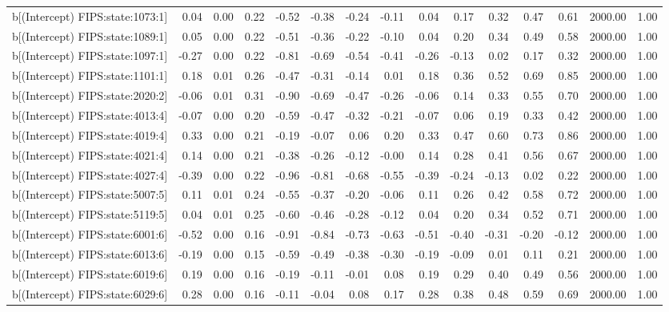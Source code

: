 \begin{table}[ht]
\begin{tabular}{rrrrrrrrrrrrrrr}
  b[(Intercept) FIPS:state:1073:1] & 0.04 & 0.00 & 0.22 & -0.52 & -0.38 & -0.24 & -0.11 & 0.04 & 0.17 & 0.32 & 0.47 & 0.61 & 2000.00 & 1.00 \\ 
  b[(Intercept) FIPS:state:1089:1] & 0.05 & 0.00 & 0.22 & -0.51 & -0.36 & -0.22 & -0.10 & 0.04 & 0.20 & 0.34 & 0.49 & 0.58 & 2000.00 & 1.00 \\ 
  b[(Intercept) FIPS:state:1097:1] & -0.27 & 0.00 & 0.22 & -0.81 & -0.69 & -0.54 & -0.41 & -0.26 & -0.13 & 0.02 & 0.17 & 0.32 & 2000.00 & 1.00 \\ 
  b[(Intercept) FIPS:state:1101:1] & 0.18 & 0.01 & 0.26 & -0.47 & -0.31 & -0.14 & 0.01 & 0.18 & 0.36 & 0.52 & 0.69 & 0.85 & 2000.00 & 1.00 \\ 
  b[(Intercept) FIPS:state:2020:2] & -0.06 & 0.01 & 0.31 & -0.90 & -0.69 & -0.47 & -0.26 & -0.06 & 0.14 & 0.33 & 0.55 & 0.70 & 2000.00 & 1.00 \\ 
  b[(Intercept) FIPS:state:4013:4] & -0.07 & 0.00 & 0.20 & -0.59 & -0.47 & -0.32 & -0.21 & -0.07 & 0.06 & 0.19 & 0.33 & 0.42 & 2000.00 & 1.00 \\ 
  b[(Intercept) FIPS:state:4019:4] & 0.33 & 0.00 & 0.21 & -0.19 & -0.07 & 0.06 & 0.20 & 0.33 & 0.47 & 0.60 & 0.73 & 0.86 & 2000.00 & 1.00 \\ 
  b[(Intercept) FIPS:state:4021:4] & 0.14 & 0.00 & 0.21 & -0.38 & -0.26 & -0.12 & -0.00 & 0.14 & 0.28 & 0.41 & 0.56 & 0.67 & 2000.00 & 1.00 \\ 
  b[(Intercept) FIPS:state:4027:4] & -0.39 & 0.00 & 0.22 & -0.96 & -0.81 & -0.68 & -0.55 & -0.39 & -0.24 & -0.13 & 0.02 & 0.22 & 2000.00 & 1.00 \\ 
  b[(Intercept) FIPS:state:5007:5] & 0.11 & 0.01 & 0.24 & -0.55 & -0.37 & -0.20 & -0.06 & 0.11 & 0.26 & 0.42 & 0.58 & 0.72 & 2000.00 & 1.00 \\ 
  b[(Intercept) FIPS:state:5119:5] & 0.04 & 0.01 & 0.25 & -0.60 & -0.46 & -0.28 & -0.12 & 0.04 & 0.20 & 0.34 & 0.52 & 0.71 & 2000.00 & 1.00 \\ 
  b[(Intercept) FIPS:state:6001:6] & -0.52 & 0.00 & 0.16 & -0.91 & -0.84 & -0.73 & -0.63 & -0.51 & -0.40 & -0.31 & -0.20 & -0.12 & 2000.00 & 1.00 \\ 
  b[(Intercept) FIPS:state:6013:6] & -0.19 & 0.00 & 0.15 & -0.59 & -0.49 & -0.38 & -0.30 & -0.19 & -0.09 & 0.01 & 0.11 & 0.21 & 2000.00 & 1.00 \\ 
  b[(Intercept) FIPS:state:6019:6] & 0.19 & 0.00 & 0.16 & -0.19 & -0.11 & -0.01 & 0.08 & 0.19 & 0.29 & 0.40 & 0.49 & 0.56 & 2000.00 & 1.00 \\ 
  b[(Intercept) FIPS:state:6029:6] & 0.28 & 0.00 & 0.16 & -0.11 & -0.04 & 0.08 & 0.17 & 0.28 & 0.38 & 0.48 & 0.59 & 0.69 & 2000.00 & 1.00 \\ 

\end{tabular}
\end{table}
